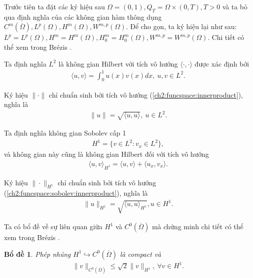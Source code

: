 \documentclass[12pt,a4paper]{article}
\newtheorem{lemma}[theorem]{Bổ đề}[section]
\theoremstyle{definition}
\theoremstyle{definition}
\begin{document}
Trước tiên ta đặt các ký hiệu sau $\Omega = (0,1), Q_T = \Omega \times (0,T), T > 0$ và ta bỏ qua định nghĩa của các không gian hàm thông dụng $C^m(\overline{\Omega}), L^p(\Omega), H^m(\Omega), W^{m,p}(\Omega)$. Để cho gọn, ta ký hiệu lại như sau: $L^p = L^p(\Omega), H^m = H^m(\Omega), H^m_0 = H^m_0(\Omega), W^{m,p} = W^{m,p}(\Omega)$. Chi tiết có thể xem trong Brézis \cite{Bre}.

Ta định nghĩa $L^2$ là không gian Hilbert với tích vô hướng $\langle \cdot,\cdot \rangle$ được xác định bởi
\begin{align}
    \langle u, v \rangle = \int_0^1 u(x)v(x)dx, \: u, v \in L^2. \label{ch2:funcspace:innerproduct}
\end{align}

Ký hiệu $\|\cdot\|$ chỉ chuẩn sinh bởi tích vô hướng (\ref{ch2:funcspace:innerproduct}), nghĩa là
\begin{align}
    \|u\| = \sqrt{\langle u, u \rangle}, \: u \in L^2. \label{ch2:funcspace:norm}
\end{align}

Ta định nghĩa không gian Sobolev cấp 1
\begin{align}
    H^1 = \{ v \in L^2 : v_x \in L^2 \}, \label{ch2:funcspace:sobolev}
\end{align}
và không gian này cũng là không gian Hilbert đối với tích vô hướng
\begin{align}
    \langle u, v \rangle_{H^1} = \langle u, v \rangle + \langle u_x, v_x \rangle. \label{ch2:funcspace:sobolev:innerproduct}
\end{align}

Ký hiệu $\|\cdot\|_{H^1}$ chỉ chuẩn sinh bởi tích vô hướng (\ref{ch2:funcspace:sobolev:innerproduct}), nghĩa là
\begin{align}
    \|u\|_{H^1} = \sqrt{\langle u, u \rangle_{H^1}}, u \in H^1. \label{ch2:funcspace:sobolev:norm}
\end{align}

Ta có bổ đề về sự liên quan giữa $H^1$ và $C^0(\overline{\Omega})$ mà chứng minh chi tiết có thể xem trong Brézis \cite{Bre}.

\begin{lemma}
Phép nhúng $H^1 \hookrightarrow C^0(\overline{\Omega})$ là compact và
\begin{align}
    \|v\|_{C^0(\overline{\Omega})} \le \sqrt{2} \|v\|_{H^1}, \: \forall v \in H^1. \label{ch2:funcspace:compactembeded}
\end{align}
\end{lemma}
\end{document}
